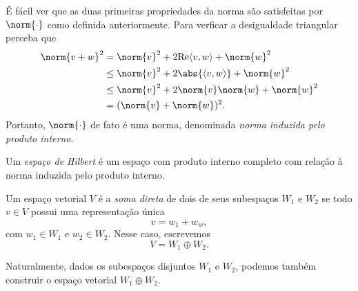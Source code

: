 É fácil ver que as duas primeiras propriedades da norma são satisfeitas por \( \norm{ \cdot } \) como definida anteriormente.
Para verficar a desigualdade triangular perceba que
\begin{align*}
    \norm{ v + w }^2
    &= \norm{ v }^2 + 2 \Re \dotprod{v, w} + \norm{ w }^2 \\
    &\leq \norm{ v }^2 + 2 \abs{ \dotprod{v, w} } + \norm{ w }^2 \\
    &\leq \norm{ v }^2 + 2 \norm{ v } \norm{ w } + \norm{ w }^2 \\
    &= ( \norm{ v } + \norm{ w } )^2
.\end{align*}
Portanto, \( \norm{ \cdot } \) de fato é uma norma, denominada \emph{norma induzida pelo produto interno}.

\begin{defn}
    Um \emph{espaço de Hilbert} é um espaço com produto interno completo com relação à norma induzida pelo produto interno.
\end{defn}

\begin{defn}
    Um espaço vetorial \( V \) é a \emph{soma direta} de dois de seus subespaços \( W_{ 1 } \) e \( W_{ 2 } \) se todo \( v \in V \) possui uma representação única \[
        v = w_{ 1 } + w_{ w }
    ,\]
    com \( w_{ 1 } \in W_{ 1 } \) e \( w_{ 2 } \in W_{ 2 } \).
    Nesse caso, escrevemos \[
        V = W_{ 1 } \oplus W_{ 2 }
    .\]
\end{defn}
\begin{rem}
    Naturalmente, dados os subespaços disjuntos \( W_{ 1 } \) e \( W_{ 2 } \), podemos também construir o espaço vetorial \( W_{ 1 } \oplus W_{ 2 } \).
\end{rem}